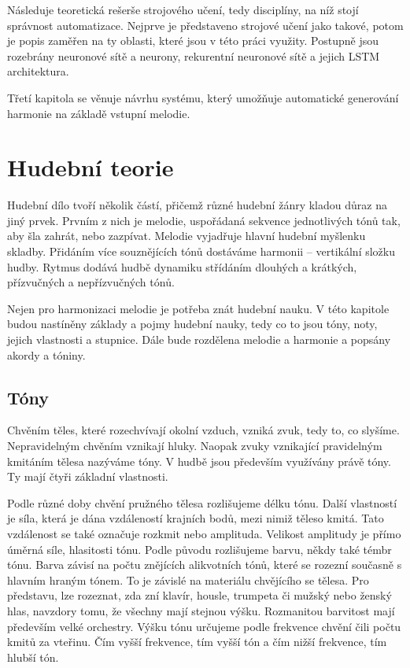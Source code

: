 Následuje teoretická rešerše strojového učení,
tedy disciplíny, na níž stojí správnost automatizace.
Nejprve je představeno strojové učení jako takové,
potom je popis zaměřen na ty oblasti, 
které jsou v této práci využity.
Postupně jsou rozebrány neuronové sítě a neurony,
rekurentní neuronové sítě a jejich LSTM architektura.
\par

Třetí kapitola se věnuje návrhu systému,
který umožňuje automatické generování harmonie na základě vstupní melodie.

\chapter{Hudební teorie}
Hudební dílo tvoří několik částí, 
přičemž různé hudební žánry kladou důraz na jiný prvek.
Prvním z nich je melodie, uspořádaná sekvence jednotlivých tónů tak,
aby šla zahrát, nebo zazpívat. 
Melodie vyjadřuje hlavní hudební myšlenku skladby. 
Přidáním více souznějících tónů dostáváme harmonii -- vertikální složku hudby.
Rytmus dodává hudbě dynamiku střídáním dlouhých a krátkých,
přízvučných a nepřízvučných tónů.
\par

Nejen pro harmonizaci melodie je potřeba znát hudební nauku. 
V této kapitole budou nastíněny základy a pojmy hudební nauky, 
tedy co to jsou tóny, noty, jejich vlastnosti a stupnice. 
Dále bude rozdělena melodie a harmonie a popsány akordy a tóniny. 
\par 

\section{Tóny}
Chvěním těles, které rozechvívají okolní vzduch, vzniká zvuk, 
tedy to, co slyšíme. 
Nepravidelným chvěním vznikají hluky. 
Naopak zvuky vznikající pravidelným kmitáním tělesa nazýváme tóny. 
V hudbě jsou především využívány právě tóny. 
Ty mají čtyři základní vlastnosti. 
\par

Podle různé doby chvění pružného tělesa rozlišujeme délku tónu. 
Další vlastností je síla, která je dána vzdáleností krajních bodů,
mezi nimiž těleso kmitá.
Tato vzdálenost se také označuje rozkmit nebo amplituda.
Velikost amplitudy je přímo úměrná síle, hlasitosti tónu.
Podle původu rozlišujeme barvu, někdy také témbr tónu.
Barva závisí na počtu znějících alikvotních tónů,
které se rozezní současně s hlavním hraným tónem. 
To je závislé na materiálu chvějícího se tělesa.
Pro představu, lze rozeznat, zda zní klavír, housle, trumpeta či mužský nebo ženský hlas, 
navzdory tomu, že všechny mají stejnou výšku. 
Rozmanitou barvitost mají především velké orchestry.
Výšku tónu určujeme podle frekvence chvění čili počtu kmitů za vteřinu. 
Čím vyšší frekvence, tím vyšší tón a čím nižší frekvence, tím hlubší tón.
\cite{zenkl,cmiral} 
\par

